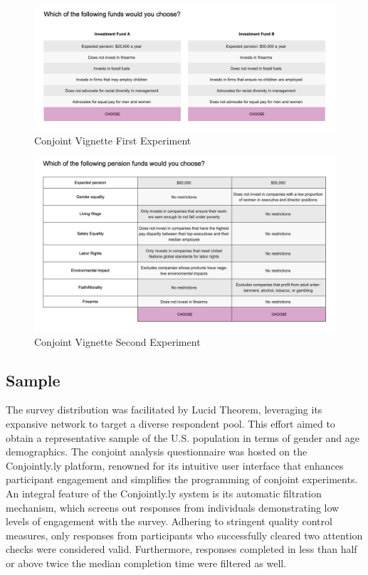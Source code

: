 \documentclass[
  12pt,
]{article}
\begin{document}
\begin{figure}

{\centering \includegraphics{cj1} 

}

\caption{Conjoint Vignette First Experiment}\label{fig:cj1}
\end{figure}

\begin{figure}

{\centering \includegraphics{cj2} 

}

\caption{Conjoint Vignette Second Experiment}\label{fig:cj2}
\end{figure}

\hypertarget{sample}{%
\subsection{Sample}\label{sample}}

The survey distribution was facilitated by Lucid Theorem, leveraging its expansive network to target a diverse respondent pool. This effort aimed to obtain a representative sample of the U.S. population in terms of gender and age demographics. The conjoint analysis questionnaire was hosted on the Conjointly.ly platform, renowned for its intuitive user interface that enhances participant engagement and simplifies the programming of conjoint experiments. An integral feature of the Conjointly.ly system is its automatic filtration mechanism, which screens out responses from individuals demonstrating low levels of engagement with the survey. Adhering to stringent quality control measures, only responses from participants who successfully cleared two attention checks were considered valid. Furthermore, responses completed in less than half or above twice the median completion time were filtered as well.
\end{document}
